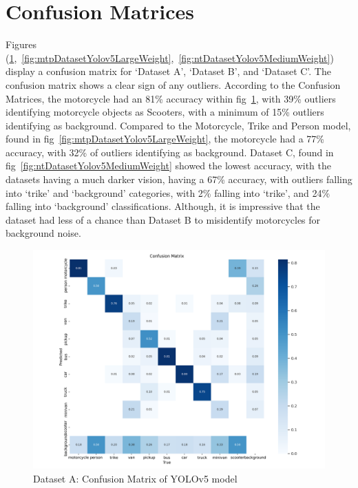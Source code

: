 \documentclass[12pt]{report} %
\begin{document}
	\section{Confusion Matrices}
		Figures (\ref{fig:ukDatasetYolov5LargeWeight},~\ref{fig:mtpDatasetYolov5LargeWeight},~\ref{fig:ntDatasetYolov5MediumWeight}) display a confusion matrix for `Dataset A', `Dataset B', and `Dataset C'. The confusion matrix shows a clear sign of any outliers. According to the Confusion Matrices, the motorcycle had an 81\% accuracy within fig~\ref{fig:ukDatasetYolov5LargeWeight}, with 39\% outliers identifying motorcycle objects as Scooters, with a minimum of 15\% outliers identifying as background. Compared to the Motorcycle, Trike and Person model, found in fig~\ref{fig:mtpDatasetYolov5LargeWeight}, the motorcycle had a 77\% accuracy, with 32\% of outliers identifying as background. Dataset C, found in fig~\ref{fig:ntDatasetYolov5MediumWeight} showed the lowest accuracy, with the datasets having a much darker vision, having a 67\% accuracy, with outliers falling into `trike' and `background' categories, with 2\% falling into `trike', and 24\% falling into `background' classifications. Although, it is impressive that the dataset had less of a chance than Dataset B to misidentify motorcycles for background noise.

		\begin{figure}[ht]
			\centering
			\includegraphics[width=1\columnwidth]{Figures/dataset_a/a_confusion_matrix.png}
			\caption{Dataset A: Confusion Matrix of YOLOv5 model}
			\label{fig:ukDatasetYolov5LargeWeight}
		\end{figure}
\end{document}
